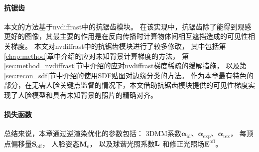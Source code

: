 \paragraph{抗锯齿}
本文的方法基于nvdiffrast中的抗锯齿模块。
在该实现中，抗锯齿除了能得到观感更好的图像，其最主要的作用是在反向传播时计算物体间相互遮挡造成的可见性相关梯度。
本文对nvdiffrast中的抗锯齿模块进行了较多修改，
其中包括第\ref{chap:method}章中介绍的应对未知背景计算梯度的方法，
第\ref{sec:method_nvdiffrast}节中介绍的应对nvdiffrast梯度稀疏的缓解措施，
以及第\ref{sec:recon_sdf}节中介绍的使用SDF贴图对边缘分类的方法。
作为本章最有特色的部分，在无需人脸关键点监督的情况下，本文借助抗锯齿模块提供的可见性梯度实现了人脸模型和具有未知背景的照片的精确对齐。

\paragraph{损失函数}
总结来说，本章通过逆渲染优化的参数包括：
3DMM系数$\mathbf{\alpha}_\mathrm{id}$、$\mathbf{\alpha}_\mathrm{exp}$、$\mathbf{\alpha}_\mathrm{tex}$，
每顶点偏移量$\mathbf{S}_\mathrm{off}$，
人脸姿态$\mathbf{M}_\mathrm{c}$，
以及球谐光照系数$\mathbf{L}$
和修正光照场$\mathbf{E}^\mathrm{off}$。

